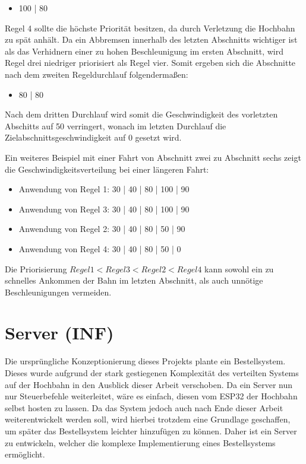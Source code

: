 \begin{center}
	\begin{itemize}
		\item 100 | 80
	\end{itemize}
\end{center}

Regel 4 sollte die höchste Priorität besitzen, da durch Verletzung die Hochbahn zu spät anhält. Da ein Abbremsen innerhalb des letzten Abschnitts wichtiger ist als das Verhidnern einer zu hohen Beschleunigung im ersten Abschnitt, wird Regel drei niedriger priorisiert als Regel vier. Somit ergeben sich die Abschnitte nach dem zweiten Regeldurchlauf folgendermaßen:

\begin{center}
	\begin{itemize}
		\item 80 | 80
	\end{itemize}
\end{center}

Nach dem dritten Durchlauf wird somit die Geschwindigkeit des vorletzten Abschitts auf 50 verringert, wonach im letzten Durchlauf die Zielabschnittsgeschwindigkeit auf 0 gesetzt wird. 

Ein weiteres Beispiel mit einer Fahrt von Abschnitt zwei zu Abschnitt sechs zeigt die Geschwindigkeitsverteilung bei einer längeren Fahrt:

\begin{center}
	\begin{itemize}
		\item Anwendung von Regel 1: 30 | 40 | 80 | 100 | 90 
		\item Anwendung von Regel 3: 30 | 40 | 80 | 100 | 90 
		\item Anwendung von Regel 2: 30 | 40 | 80 |  50 | 90 
		\item Anwendung von Regel 4: 30 | 40 | 80 |  50 |  0 
	\end{itemize}
\end{center}

Die Priorisierung $Regel1 <  Regel3 <  Regel2  < Regel4$ kann  sowohl ein zu schnelles Ankommen der Bahn im letzten Abschnitt, als auch unnötige Beschleunigungen vermeiden.

\chapter{Server (INF)}
Die ursprüngliche Konzeptionierung dieses Projekts plante ein Bestellsystem. Dieses wurde aufgrund der stark gestiegenen Komplexität des verteilten Systems auf der Hochbahn in den Ausblick dieser Arbeit verschoben. Da ein Server nun nur Steuerbefehle weiterleitet, wäre es einfach, diesen vom ESP32 der Hochbahn selbst hosten zu lassen. Da das System jedoch auch nach Ende dieser Arbeit weiterentwickelt werden soll, wird hierbei trotzdem eine Grundlage geschaffen, um später das Bestellsystem leichter hinzufügen zu können. Daher ist ein Server zu entwickeln, welcher die komplexe Implementierung eines Bestellsystems ermöglicht. 
